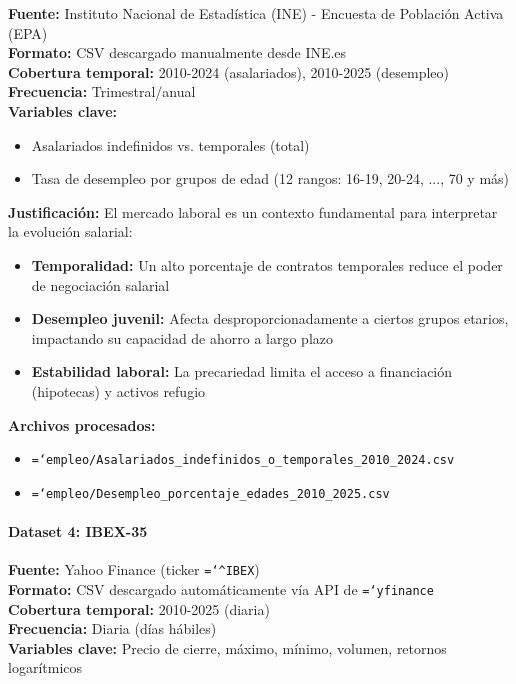 \documentclass{article}
\let\oldtexttt\texttt  %
\renewcommand{\texttt}[1]{{\footnotesize\oldtexttt{\hyphenchar\font=`\-#1}}}  %
\begin{document}
\textbf{Fuente:} Instituto Nacional de Estad\'istica (INE) - Encuesta de Poblaci\'on Activa (EPA)\\
\textbf{Formato:} CSV descargado manualmente desde INE.es\\
\textbf{Cobertura temporal:} 2010-2024 (asalariados), 2010-2025 (desempleo)\\
\textbf{Frecuencia:} Trimestral/anual\\
\textbf{Variables clave:}
\begin{itemize}
    \item Asalariados indefinidos vs. temporales (total)
    \item Tasa de desempleo por grupos de edad (12 rangos: 16-19, 20-24, ..., 70 y m\'as)
\end{itemize}

\textbf{Justificaci\'on:} El mercado laboral es un contexto fundamental para interpretar la evoluci\'on salarial:
\begin{itemize}
    \item \textbf{Temporalidad:} Un alto porcentaje de contratos temporales reduce el poder de negociaci\'on salarial
    \item \textbf{Desempleo juvenil:} Afecta desproporcionadamente a ciertos grupos etarios, impactando su capacidad de ahorro a largo plazo
    \item \textbf{Estabilidad laboral:} La precariedad limita el acceso a financiaci\'on (hipotecas) y activos refugio
\end{itemize}

\textbf{Archivos procesados:}
\begin{itemize}
    \item \texttt{empleo/Asalariados\_indefinidos\_o\_temporales\_2010\_2024.csv}
    \item \texttt{empleo/Desempleo\_porcentaje\_edades\_2010\_2025.csv}
\end{itemize}


\paragraph{Dataset 4: IBEX-35}

\textbf{Fuente:} Yahoo Finance (ticker \texttt{\^{}IBEX})\\
\textbf{Formato:} CSV descargado autom\'aticamente v\'ia API de \texttt{yfinance}\\
\textbf{Cobertura temporal:} 2010-2025 (diaria)\\
\textbf{Frecuencia:} Diaria (d\'ias h\'abiles)\\
\textbf{Variables clave:} Precio de cierre, m\'aximo, m\'inimo, volumen, retornos logar\'itmicos
\end{document}
